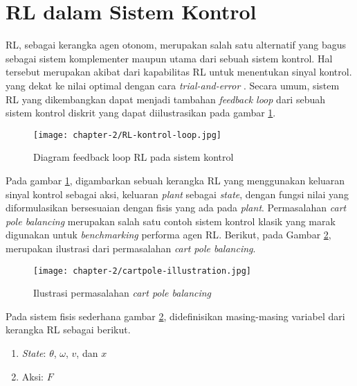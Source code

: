 \section{\acl{RL} dalam Sistem Kontrol}
\label{sec:rl-kontrol}

\ac{RL}, sebagai kerangka agen otonom, merupakan salah satu alternatif yang bagus sebagai sistem komplementer maupun utama dari sebuah sistem kontrol. Hal tersebut merupakan akibat dari kapabilitas \ac{RL} untuk menentukan sinyal kontrol. yang dekat ke nilai optimal dengan cara \textit{trial-and-error} \parencite{vichugov2005application}. Secara umum, sistem RL yang dikembangkan dapat menjadi tambahan \textit{feedback loop} dari sebuah sistem kontrol diskrit yang dapat diilustrasikan pada gambar \ref{fig:RL-loop-kontrol}.


\begin{figure}[H]
	\centering
	\texttt{[image: chapter-2/RL-kontrol-loop.jpg]}
	\caption{Diagram feedback loop \ac{RL} pada sistem kontrol \parencite{vichugov2005application}}
	\label{fig:RL-loop-kontrol}
\end{figure}

Pada gambar \ref{fig:RL-loop-kontrol}, digambarkan sebuah kerangka \ac{RL} yang menggunakan keluaran sinyal kontrol sebagai aksi, keluaran \textit{plant} sebagai \textit{state}, dengan fungsi nilai yang diformulasikan bersesuaian dengan fisis yang ada pada \textit{plant}. Permasalahan \textit{cart pole balancing} \parencite{nagendra2017comparison} merupakan salah satu contoh sistem kontrol klasik yang marak digunakan untuk \textit{benchmarking} performa agen \ac{RL}. Berikut, pada Gambar \ref{fig:cartpole-illustration}, merupakan ilustrasi dari permasalahan \textit{cart pole balancing}.

\begin{figure}[h]
	\centering
	\texttt{[image: chapter-2/cartpole-illustration.jpg]}
	\caption{Ilustrasi permasalahan \textit{cart pole balancing}}
	\label{fig:cartpole-illustration}
\end{figure}

Pada sistem fisis sederhana gambar \ref{fig:cartpole-illustration}, didefinisikan masing-masing variabel dari kerangka \ac{RL} sebagai berikut.

\begin{enumerate}
	\item \textit{State}: \(\theta\), \(\omega\), \(v\), dan \(x\)
	\item Aksi: \(F\)
\end{enumerate}

